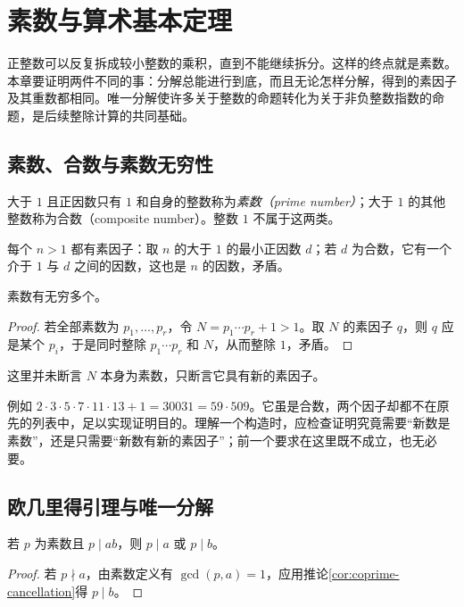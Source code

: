 \setcounter{chapter}{2} %
\chapter{素数与算术基本定理}
\label{ch:primes}

正整数可以反复拆成较小整数的乘积，直到不能继续拆分。这样的终点就是素数。本章要证明两件不同的事：分解总能进行到底，而且无论怎样分解，得到的素因子及其重数都相同。唯一分解使许多关于整数的命题转化为关于非负整数指数的命题，是后续整除计算的共同基础。

\section{素数、合数与素数无穷性}

\begin{definition}
大于 $1$ 且正因数只有 $1$ 和自身的整数称为\emph{素数（prime number）}；大于 $1$ 的其他整数称为合数（composite number）。整数 $1$ 不属于这两类。
\end{definition}

每个 $n>1$ 都有素因子：取 $n$ 的大于 $1$ 的最小正因数 $d$；若 $d$ 为合数，它有一个介于 $1$ 与 $d$ 之间的因数，这也是 $n$ 的因数，矛盾。

\begin{theorem}[素数无穷性]
素数有无穷多个。
\end{theorem}
\begin{proof}
若全部素数为 $p_1,\ldots,p_r$，令 $N=p_1\cdots p_r+1>1$。取 $N$ 的素因子 $q$，则 $q$ 应是某个 $p_i$，于是同时整除 $p_1\cdots p_r$ 和 $N$，从而整除 $1$，矛盾。
\end{proof}

这里并未断言 $N$ 本身为素数，只断言它具有新的素因子。

例如 $2\cdot3\cdot5\cdot7\cdot11\cdot13+1=30031=59\cdot509$。它虽是合数，两个因子却都不在原先的列表中，足以实现证明目的。理解一个构造时，应检查证明究竟需要“新数是素数”，还是只需要“新数有新的素因子”；前一个要求在这里既不成立，也无必要。

\section{欧几里得引理与唯一分解}

\begin{lemma}
\label{lem:euclid-prime}
若 $p$ 为素数且 $p\mid ab$，则 $p\mid a$ 或 $p\mid b$。
\end{lemma}
\begin{proof}
若 $p\nmid a$，由素数定义有 $\gcd(p,a)=1$，应用推论\ref{cor:coprime-cancellation}得 $p\mid b$。
\end{proof}

